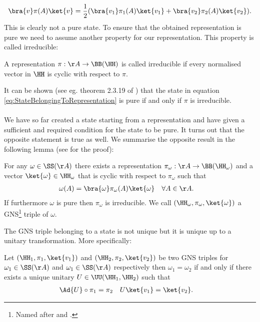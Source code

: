 \begin{equation}
\bra{v}\pi(A)\ket{v}=\frac{1}{2}(\bra{v_1}\pi_1(A)\ket{v_1}+\bra{v_2}\pi_2(A)\ket{v_2}).
\end{equation}
This is clearly not a pure state. To ensure that the obtained representation is pure we need to assume another property for our representation. This property is called irreducible:
\begin{definition}
	A representation $\pi:\AA\rightarrow \BB(\HH)$ is called irreducible if every normalised vector in $\HH$ is cyclic with respect to $\pi$.
\end{definition}
It can be shown (see eg. theorem 2.3.19 of \cite{bratteli1979operator}) that the state in equation \eqref{eq:StateBelongingToRepresentation} is pure if and only if $\pi$ is irreducible.\\\\
We have so far created a state starting from a representation and have given a sufficient and required condition for the state to be pure. It turns out that the opposite statement is true as well. We summarise the opposite result in the following lemma (see \cite{bratteli1979operator} for the proof):
\begin{lemma}
	For any $\omega\in\SS(\AA)$ there exists a representation $\pi_\omega:\AA\rightarrow\BB(\HH_\omega)$ and a vector $\ket{\omega}\in\HH_\omega$ that is cyclic with respect to $\pi_\omega$ such that
	\begin{align}
	\omega(A)&=\bra{\omega}\pi_\omega(A)\ket{\omega}&\forall A&\in\AA.
	\end{align}
	If furthermore $\omega$ is pure then $\pi_\omega$ is irreducible. We call $(\HH_\omega,\pi_\omega,\ket{\omega})$ a GNS\footnote{Named after \cite{gelfand1943imbedding} and \cite{segal1947irreducible}.} triple of $\omega$.
\end{lemma}
The GNS triple belonging to a state is not unique but it is unique up to a unitary transformation. More specifically:
\begin{lemma}\label{lem:UniquenessOfGNSTriple}
	Let $(\HH_1,\pi_1,\ket{v_1})$ and $(\HH_2,\pi_2,\ket{v_2})$ be two GNS triples for $\omega_1\in\SS(\AA)$ and $\omega_1\in\SS(\AA)$ respectively then $\omega_1=\omega_2$ if and only if there exists a unique unitary $U\in\UU(\HH_1,\HH_2)$ such that
	\begin{align}
	\Ad{U}\circ\pi_1&=\pi_2&U\ket{v_1}&=\ket{v_2}.
	\end{align}
\end{lemma}
